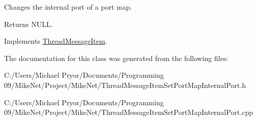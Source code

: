 Changes the internal port of a port map. 

\begin{DoxyReturn}{Returns}
NULL. 
\end{DoxyReturn}


Implements \hyperlink{class_thread_message_item_ae09a47834e313524b19700ebc92b0dfe}{ThreadMessageItem}.



The documentation for this class was generated from the following files:\begin{DoxyCompactItemize}
\item 
C:/Users/Michael Pryor/Documents/Programming 09/MikeNet/Project/MikeNet/ThreadMessageItemSetPortMapInternalPort.h\item 
C:/Users/Michael Pryor/Documents/Programming 09/MikeNet/Project/MikeNet/ThreadMessageItemSetPortMapInternalPort.cpp\end{DoxyCompactItemize}
